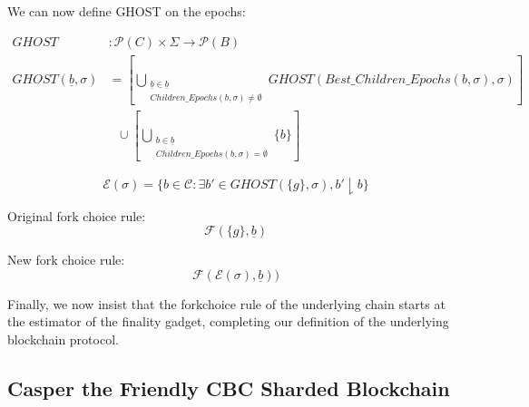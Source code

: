 We can now define GHOST on the epochs:

\begin{defn}
\begin{align*}
GHOST&: \mathcal{P}(C) \times \Sigma \to \mathcal{P}(B)\\
GHOST(\underline{b}, \sigma) &= [ \bigcup\limits_{\substack{\underline{b} \in \underline{b} \\ Children\_Epochs(b, \sigma) \neq \emptyset}} GHOST(Best\_Children\_Epochs(b, \sigma), \sigma) ] \\
&~~~\cup [ \bigcup\limits_{\substack{b \in \underline{b} \\ Children\_Epochs(b, \sigma) = \emptyset}} \{b\} ]
\end{align*}
\end{defn}



\begin{defn}

$$
\mathcal{E}(\sigma) = \{ b \in \mathcal{C}: \exists b' \in GHOST(\{g\}, \sigma), b' \downharpoonright b \}
$$

\end{defn}

\begin{defn}
Original fork choice rule:
$$
\mathcal{F}(\{g\}, \underline{b})
$$

New fork choice rule:
$$
\mathcal{F}(\mathcal{E}(\sigma), \underline{b}))
$$

\end{defn}

Finally, we now insist that the forkchoice rule of the underlying chain starts at the estimator of the finality gadget, completing our definition of the underlying blockchain protocol.


\subsection{Casper the Friendly CBC Sharded Blockchain}

